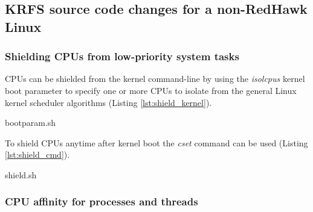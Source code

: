 \documentclass[12pt]{article}
\begin{document}
\subsection{KRFS source code changes for a non-RedHawk Linux}

\subsubsection{Shielding CPUs from low-priority system tasks}

CPUs can be shielded from the kernel command-line by using the \emph{isolcpus}
kernel boot parameter to specify one or more CPUs to isolate from the general
Linux kernel scheduler algorithms (Listing \ref{lst:shield_kernel}).


\vspace{0.8cm}
\lstset{
    language=bash,
    basicstyle=\footnotesize\ttfamily,
    linewidth=6in,
    frame=single,
    showstringspaces=false,
    keywordstyle=\ttfamily
}
\begin{minipage}{\linewidth}
\begin{adjustwidth}{0.0in}{0.0in}
\begin{lstinputlisting}[caption={Shielding CPUs at at kernel boot command-line},
label={lst:shield_kernel}]{bootparam.sh}

\end{lstinputlisting}
\end{adjustwidth}
\end{minipage}
\vspace{0.8cm}

To shield CPUs anytime after kernel boot the \emph{cset} command can be used
(Listing \ref{lst:shield_cmd}).

\vspace{0.8cm}
\lstset{
    language=bash,
    basicstyle=\footnotesize\ttfamily,
    linewidth=6in,
    showstringspaces=false,
    keywordstyle=\ttfamily
}
\begin{adjustwidth}{0.0in}{0.0in}
\begin{lstinputlisting}[caption={Shielding CPUs at command-line},
label={lst:shield_cmd}]{shield.sh}

\end{lstinputlisting}
\end{adjustwidth}
\vspace{0.8cm}

\subsubsection{CPU affinity for processes and threads}
\end{document}
